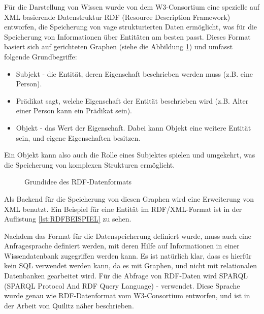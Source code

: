 Für die Darstellung von Wissen wurde von dem W3-Consortium\cite{klyne2006resource} eine spezielle auf XML basierende Datenstruktur RDF (Resource Description Framework) entworfen, die Speicherung von vage strukturierten Daten ermöglicht, was für die Speicherung von Informationen über Entitäten am besten passt. Dieses Format basiert sich auf gerichteten Graphen (siehe die Abbildung \ref{fig:graph-rdf}) und umfasst folgende Grundbegriffe:
\begin{itemize}
\item Subjekt - die Entität, deren Eigenschaft beschrieben werden muss (z.B. eine Person).
\item Prädikat sagt, welche Eigenschaft der Entität beschrieben wird (z.B. Alter einer Person kann ein Prädikat sein).
\item Objekt - das Wert der Eigenschaft. Dabei kann Objekt eine weitere Entität sein, und eigene Eigenschaften besitzen. 
\end{itemize}
Ein Objekt kann also auch die Rolle eines Subjektes spielen und umgekehrt, was die Speicherung von komplexen Strukturen ermöglicht.

\begin{figure}[ht]
\vbox{\small}
\caption{Grundidee des RDF-Datenformats}
\label{fig:graph-rdf}
\end{figure}

Als Backend für die Speicherung von diesen Graphen wird eine Erweiterung von XML benutzt. Ein Beispiel für eine Entität im RDF/XML-Format ist in der Auflistung \ref{lst:RDFBEISPIEL} zu sehen.

\lstset{language=XML}


Nachdem das Format für die Datenspeicherung definiert wurde, muss auch eine Anfragesprache definiert werden, mit deren Hilfe auf Informationen in einer Wissendatenbank zugegriffen werden kann. Es ist natürlich klar, dass es hierfür kein SQL verwendet werden kann, da es mit Graphen, und nicht mit relationalen Datenbanken gearbeitet wird. Für die Abfrage von RDF-Daten wird SPARQL (SPARQL Protocol And RDF Query Language) - verwendet. Diese Sprache wurde genau wie RDF-Datenformat vom W3-Consortium entworfen, und ist in der Arbeit von Quilitz\cite{quilitz2008querying} näher beschrieben.

